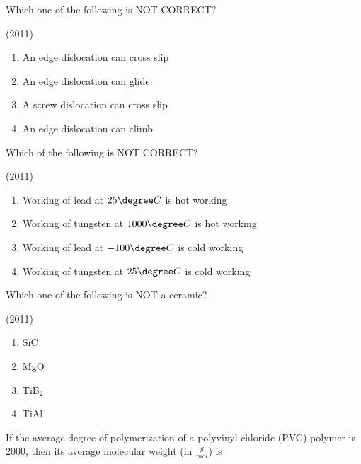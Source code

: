     \item Which one of the following is NOT CORRECT?
    
    \hfill{(2011)}

    \begin{multicols}{2}
        \begin{enumerate}
            \item An edge dislocation can cross slip
            \item An edge dislocation can glide
            \item A screw dislocation can cross slip
            \item An edge dislocation can climb
        \end{enumerate}
    \end{multicols}

    \item Which of the following is NOT CORRECT?
    
    \hfill{(2011)}


            \begin{enumerate}
                \item Working of lead at $25\degree C$ is hot working
                \item Working of tungsten at $1000\degree C$ is hot working
                \item Working of lead at $-100\degree C$ is cold working
                \item Working of tungsten at $25\degree C$ is cold working
            \end{enumerate}

		
    \item Which one of the following is NOT a ceramic?
    
    \hfill{(2011)}

        \begin{multicols}{4}
            \begin{enumerate}
                \item SiC
                \item MgO
                \item TiB$_2$
                \item TiAl
            \end{enumerate}
        \end{multicols}

    \item If the average degree of polymerization of a polyvinyl chloride (PVC) polymer is 2000, then its average molecular weight (in $\frac{g}{mol}$) is
    
